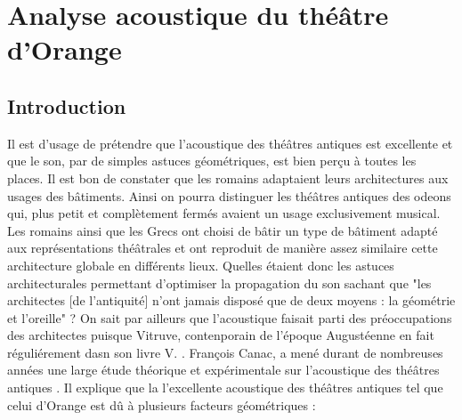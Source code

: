 \part{Analyse acoustique du théâtre d'Orange}
\label{part3}

\chapter*{Introduction}
	
 Il est d'usage de prétendre que l'acoustique des théâtres antiques est excellente et que le son, par de simples astuces géométriques, est bien perçu à toutes les places. Il est bon de constater que les romains adaptaient leurs architectures aux usages des bâtiments. Ainsi on pourra distinguer les théâtres antiques des \glspl{odeon} qui, plus petit et complètement fermés avaient un usage exclusivement musical. Les romains ainsi que les Grecs ont choisi de bâtir un type de bâtiment adapté aux représentations théâtrales et ont reproduit de manière assez similaire cette architecture globale en différents lieux. Quelles étaient donc les astuces architecturales permettant d'optimiser la propagation du son sachant que "les architectes [de l'antiquité] n'ont jamais disposé que de deux moyens : la géométrie et l'oreille" \cite[p.15]{canac} ? On sait par ailleurs que l'acoustique faisait parti des préoccupations des architectes puisque Vitruve, contenporain de l'époque Augustéenne en fait réguliérement dasn son livre V. \cite[Livre V]{vitruve}. François Canac, a mené durant de nombreuses années une large étude théorique et expérimentale sur l'acoustique des théâtres antiques \cite{canac}. Il explique que la l'excellente acoustique des théâtres antiques tel que celui d'Orange est dû à plusieurs facteurs géométriques :
